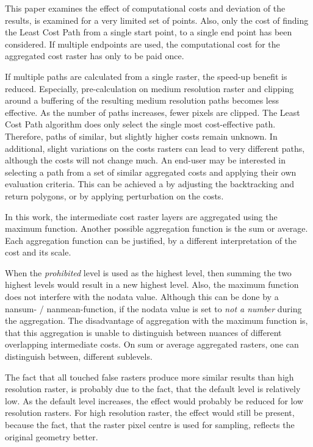 This paper examines the effect of computational costs and deviation of the results, is examined for a very limited set of points.
Also, only the cost of finding the Least Cost Path from a single start point, to a single end point has been considered.
If multiple endpoints are used, the computational cost for the aggregated cost raster has only to be paid once.

If multiple paths are calculated from a single raster, the speed-up benefit is reduced.
Especially, pre-calculation on medium resolution raster and clipping around a buffering of the resulting medium resolution paths becomes less effective.
As the number of paths increases, fewer pixels are clipped.
The Least Cost Path algorithm does only select the single most cost-effective path.
Therefore, paths of similar, but slightly higher costs remain unknown.
In additional, slight variations on the costs rasters can lead to very different paths, although the costs will not change much.
An end-user may be interested in selecting a path from a set of similar aggregated costs and applying their own evaluation criteria.
This can be achieved a by adjusting the backtracking and return polygons, or by applying perturbation on the costs.

In this work, the intermediate cost raster layers are aggregated using the maximum function. 
Another possible aggregation function is the sum or average.
Each aggregation function can be justified, by a different interpretation of the cost and its scale.

When the \textit{prohibited} level is used as the highest level, then summing the two highest levels would result in a new highest level. 
Also, the maximum function does not interfere with the nodata value. 
Although this can be done by a nansum- / nanmean-function, if the nodata value is set to \textit{not a number} during the aggregation.
The disadvantage of aggregation with the maximum function is, that this aggregation is unable to distinguish between nuances of different overlapping intermediate costs.
On sum or average aggregated rasters, one can distinguish between, different sublevels.

The fact that all touched false rasters produce more similar results than high resolution raster, is probably due to the fact, that the default level is relatively low.
As the default level increases, the effect would probably be reduced for low resolution rasters.
For high resolution raster, the effect would still be present, because the fact, that the raster pixel centre is used for sampling, reflects the original geometry better.


